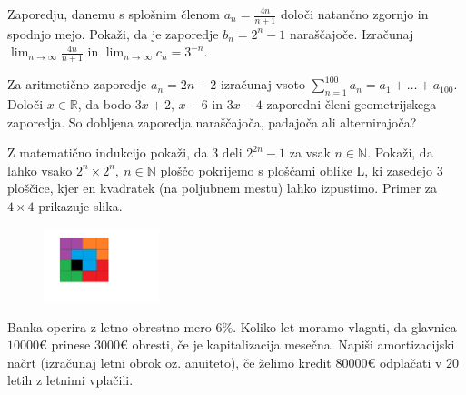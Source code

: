 \documentclass{izpit}
\begin{document}
\naloga[\tocke{9}]
  \podnaloga[4]
  Zaporedju, danemu s splošnim členom $a_n=\frac{4n}{n+1}$ določi natančno zgornjo in spodnjo mejo.
  \prostor[1]
  \podnaloga[3]
  Pokaži, da je zaporedje $b_n=2^n-1$ naraščajoče.
  \prostor[1]
  \podnaloga[2]
  Izračunaj $\lim_{n \rightarrow \infty}\frac{4n}{n+1}$ in $\lim_{n\rightarrow\infty}c_n=3^{-n}$.
  \prostor[1]
  
\naloga[\tocke{8}]
  \podnaloga[3]
  Za aritmetično zaporedje $a_n=2n-2$ izračunaj vsoto $\sum_{n=1}^{100} a_n =a_1 +\ldots +a_100$.
  \prostor[1]
  \podnaloga[5]
  Določi $x\in\mathbb{R}$, da bodo $3x+2$, $x-6$ in $3x-4$ zaporedni členi geometrijskega zaporedja. So dobljena zaporedja naraščajoča, padajoča ali alternirajoča?
  \prostor[1]


\naloga[\tocke{5}]
  Z matematično indukcijo pokaži, da $3$ deli $2^{2n}-1$ za vsak $n\in \mathbb{N}$.
  \prostor[2]
  Pokaži, da lahko vsako $2^n\times 2^n,\ n\in\mathbb{N}$ ploščo pokrijemo s ploščami oblike L, ki zasedejo 3 ploščice, kjer en kvadratek (na poljubnem mestu) lahko izpustimo. Primer za $4\times 4$ prikazuje slika.
  \begin{figure}[H]
  \centering
  \includegraphics[width =0.3\textwidth]{naloga.jpg}
  \end{figure}
  \prostor[1]


\naloga[\tocke{8}]
  Banka operira z letno obrestno mero $6\%$.
  \podnaloga[4]
  Koliko let moramo vlagati, da glavnica $10000\euro{}$ prinese $3000\euro{}$ obresti, če je kapitalizacija mesečna.
  \prostor[1]
  \podnaloga[4]
  Napiši amortizacijski načrt (izračunaj letni obrok oz. anuiteto), če želimo kredit $80000\euro{}$ odplačati v $20$ letih z letnimi vplačili.
  \prostor[1]
\end{document}
